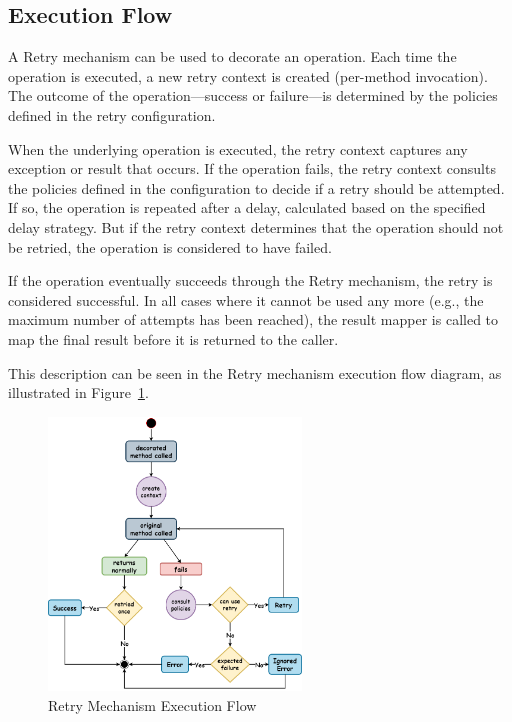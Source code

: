 \subsection{Execution Flow}\label{subsec:retry-execution-flow}

A Retry mechanism can be used to decorate an operation.
Each time the operation is executed, a new retry context is created (per-method invocation).
The outcome of the operation—success or failure—is determined by the policies defined in the retry configuration.

When the underlying operation is executed, the retry context captures any exception or result that occurs.
If the operation fails,
the retry context consults the policies defined in the configuration to decide if a retry should be attempted.
If so, the operation is repeated after a delay, calculated based on the specified delay strategy.
But if the retry context determines that the operation should not be retried,
the operation is considered to have failed.

If the operation eventually succeeds through the Retry mechanism, the retry is considered successful.
In all cases where it cannot be used any more
(e.g., the maximum number of attempts has been reached),
the result mapper is called to map the final result before it is returned to the caller.

This description can be seen in the Retry mechanism execution flow diagram,
as illustrated in Figure~\ref{fig:retry-execution-flow}.

\begin{figure}[!htb]
    \centering
    \includegraphics[width=0.6\textwidth]{../figures/04_retry-execution-flow}
    \caption{Retry Mechanism Execution Flow}
    \label{fig:retry-execution-flow}
\end{figure}


